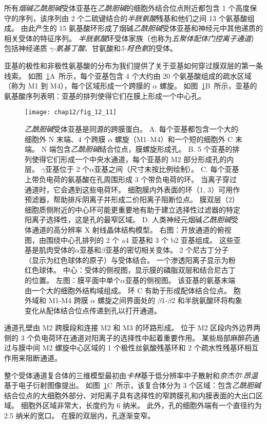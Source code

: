 所有\textit{烟碱乙酰胆碱}受体亚基在\textit{乙酰胆碱}的细胞外结合位点附近都包含 1 个高度保守的序列，该序列由 2 个二硫键结合的\textit{半胱氨酸}残基和他们之间 13 个氨基酸组成。
由此产生的 15 氨基酸环形成了烟碱\textit{乙酰胆碱}受体亚基和神经元中其他递质的相关受体的特征序列。
\textit{半胱氨酸}环受体家族（也称为\textit{五聚体配体门控离子通道}）包括神经递质 \textit{$\gamma$-氨基丁酸}、甘氨酸和\textit{5-羟色氨}的受体。


亚基的极性和非极性氨基酸的分布为我们提供了关于亚基如何穿过膜双层的第一条线索。
如图~\ref{fig:12_11}A~所示，每个亚基包含 4 个大约由 20 个氨基酸组成的疏水区域（称为 M1 到 M4），每个区域形成一个跨膜的 $\alpha$ 螺旋。
如图~\ref{fig:12_11}B~所示，亚基的氨基酸序列表明：亚基的排列使得它们在膜上形成一个中心孔。


\begin{figure}[htbp]
	\centering
	\texttt{[image: chap12/fig\_12\_11]}
	\caption{\textit{乙酰胆碱}受体亚基是同源的跨膜蛋白。
		A. 每个亚基都包含一个大的细胞外 N 末端、4 个跨膜 $\alpha$ 螺旋（M1–M4）和一个短的细胞外 C 末端。
		N 端包含\textit{乙酰胆碱}结合位点，膜螺旋形成孔。
		B. 5 个亚基的排列使得它们形成一个中央水通道，每个亚基的 M2 部分形成孔的内层。
		$\gamma$亚基位于 2 个$\alpha$亚基之间（尺寸未按比例绘制）。
		C. 每个亚基上带负电荷的氨基酸在孔周围形成 3 个带负电荷的环。
		当离子穿过通道时，它会遇到这些电荷环。
		细胞膜内外表面的环（1, 3）可用作预滤器，帮助排斥阴离子并形成二价阳离子阻断位点。
		膜双层（2）细胞质侧附近的中心环可能更重要地有助于建立选择性过滤器的特定阳离子选择性，这是孔的最窄区域。
		D. 人类神经元烟碱\textit{乙酰胆碱}受体通道的高分辨率 X 射线晶体结构模型。
		右图：开放通道的俯视图，由围绕中心孔排列的 2 个 a4 亚基和 3 个 b2 亚基组成。
		这些亚基是肌肉受体的$\alpha$亚基和$\beta$亚基的密切相关变体。
		2 个尼古丁分子（显示为红色球体的原子）与受体结合。
		一个渗透阳离子显示为粉红色球体。
		中心：受体的侧视图，显示膜的磷脂双层和结合尼古丁的位置。
		左图：膜平面中单个$\alpha$亚基的侧视图。
		该亚基的氨基末端由一个大的细胞外结构域组成。
		环 C 有助于形成配体结合位点。
		胞外域和 M1-M4 跨膜 $\alpha$ 螺旋之间界面处的 $\beta$1-$\beta$2 和半胱氨酸环将构象变化从配体结合位点传递到孔以打开通道\cite{morales2016x}。}
	\label{fig:12_11}
\end{figure}


通道孔壁由 M2 跨膜段和连接 M2 和 M3 的环路形成。
位于 M2 区段内外边界两侧的 3 个负电荷环在通道对阳离子的选择性中起着重要作用。
某些局部麻醉药通过与膜中间 M2 螺旋中心区域的 1 个极性丝氨酸残基环和 2 个疏水性残基环相互作用来阻断通道。


整个受体通道复合体的三维模型最初由\textit{卡林}基于低分辨率中子散射和\textit{奈杰尔$\cdot$昂温}基于电子衍射图像提出。
如图~\ref{fig:12_11}C~所示，该复合体分为 3 个区域：包含\textit{乙酰胆碱}结合位点的大细胞外部分、对阳离子具有选择性的窄跨膜孔和内膜表面的大出口区域。
细胞外区域非常大，长度约为 6 纳米。
此外，孔的细胞外端有一个直径约为 2.5 纳米的宽口。
在膜的双层内，孔逐渐变窄。


